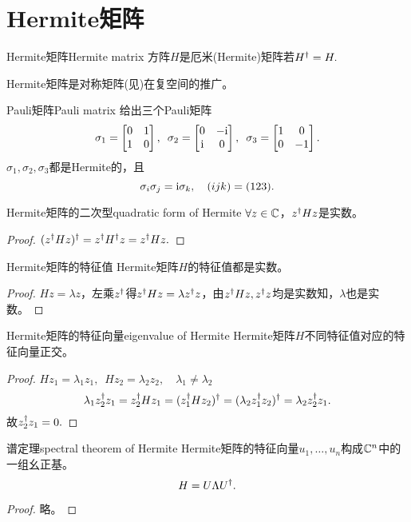 \section{Hermite矩阵}

\begin{definition}{Hermite矩阵}{Hermite matrix}
	方阵$H$是厄米(Hermite)矩阵若$H^\dagger=H.$
\end{definition}
Hermite矩阵是对称矩阵(见)在复空间的推广。

\begin{example}{Pauli矩阵}{Pauli matrix}
	给出三个Pauli矩阵
	\[
		\sigma_1=
		\begin{bmatrix}
			0&1\\1&0
		\end{bmatrix},\enspace
		\sigma_2=
		\begin{bmatrix}
			0&-\mathrm{i}\\\mathrm{i}&0
		\end{bmatrix},\enspace
		\sigma_3=
		\begin{bmatrix}
			1&0\\0&-1
		\end{bmatrix}.
	\]
	$\sigma_1,\sigma_2,\sigma_3$都是Hermite的，且
	\[
		\sigma_i\sigma_j=\mathrm{i}\sigma_k,\quad(ijk)=(123).
	\]
\end{example}

\begin{theorem}{Hermite矩阵的二次型}{quadratic form of Hermite}
	$\forall z\in\mathbb C$，$z^\dagger Hz$是实数。
\end{theorem}
\begin{proof}
	$(z^\dagger Hz)^\dagger=z^\dagger H^\dagger z=z^\dagger Hz.$
\end{proof}
\begin{theorem}{Hermite矩阵的特征值}{}
	Hermite矩阵$H$的特征值都是实数。
\end{theorem}
\begin{proof}
	$Hz=\lambda z$，左乘$z^\dagger$得$z^\dagger Hz=\lambda z^\dagger z$，由$z^\dagger Hz,z^\dagger z$均是实数知，$\lambda$也是实数。
\end{proof}
\begin{theorem}{Hermite矩阵的特征向量}{eigenvalue of Hermite}
	Hermite矩阵$H$不同特征值对应的特征向量正交。
\end{theorem}
\begin{proof}
	$Hz_1=\lambda_1z_1,\enspace Hz_2=\lambda_2z_2,\quad\lambda_1\neq\lambda_2$
	\[
		\lambda_1z_2^\dagger z_1=z_2^\dagger Hz_1=(z_1^\dagger Hz_2)^\dagger=(\lambda_2z_1^\dagger z_2)^\dagger=\lambda_2z_2^\dagger z_1.
	\]
	故$z_2^\dagger z_1=0.$
\end{proof}
\begin{theorem}{谱定理}{spectral theorem of Hermite}
	Hermite矩阵的特征向量$u_1,\ldots,u_n$构成$\mathbb C^n$中的一组幺正基。
	\[
		H=U\Lambda U^\dagger.
	\]
\end{theorem}
\begin{proof}
	略。
\end{proof}
